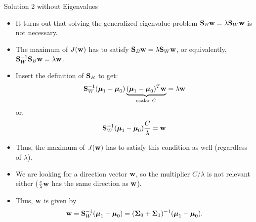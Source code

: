 \documentclass[10pt, aspectratio=169]{beamer} %
\newcommand{\w}{{\bf w}}
\newcommand{\Sigb}{\boldsymbol{\Sigma}}
\newcommand{\mub}{\boldsymbol{\mu}}
\newcommand{\SB}{{\bf S}}
\begin{document}
\begin{frame}[fragile,allowframebreaks=0.8]
 {Solution 2 without Eigenvalues}
\begin{itemize}
\item It turns out that solving the generalized eigenvalue problem $\SB_B\w = \lambda\SB_W\w$ is not necessary. 
\item The maximum of $J(\w)$ has to satisfy $\SB_B\w = \lambda\SB_W\w$, or equivalently,
$\SB_W^{-1}\SB_B\w = \lambda\w$.
\item Insert the definition of $\SB_B$ to get:
\[
\SB_W^{-1}(\mub_1 - \mub_0)\underbrace{(\mub_1 - \mub_0)^T\w}_{\text{scalar } C} = \lambda\w
\]
or,
\[
\SB_W^{-1}(\mub_1 - \mub_0) \frac{C}{\lambda} = \w
\]
\item Thus, the maximum of $J(\w)$ has to satisfy this condition as well (regardless of $\lambda$).
\item We are  looking for a direction
vector $\w$, so the multiplier $C / \lambda$ is not relevant either ($\frac{c}{\lambda}\w$ has the same direction as $\w$).
\item Thus, $\w$ is given by 
\[
\w = \SB_W^{-1}(\mub_1 - \mub_0) = (\Sigb_0 + \Sigb_1)^{-1}(\mub_1 - \mub_0).
\]
\end{itemize}
\end{frame}
\end{document}

